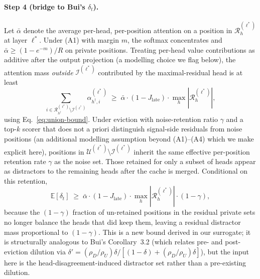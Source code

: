 \documentclass{article} %
\begin{document}
\paragraph{Step 4 (bridge to Bui's $\delta_t$).}
Let $\bar\alpha$ denote the average per-head, per-position attention on a
position in $\mathcal{R}^{(\ell^*)}_h$ at layer $\ell^*$. Under (A1)
with margin $m$, the softmax concentrates and $\bar\alpha \geq
(1 - e^{-m})/R$ on private positions. Treating per-head value
contributions as additive after the output projection (a modelling
choice we flag below), the attention mass \emph{outside}
$\mathcal{I}^{(\ell^*)}$ contributed by the maximal-residual head is at
least
\begin{equation}
\sum_{i \in \mathcal{R}^{(\ell^*)}_{h^\dagger} \setminus
\mathcal{I}^{(\ell^*)}} \alpha^{(\ell^*)}_{h^\dagger, i}
\;\geq\;
\bar\alpha \cdot (1 - J_{\text{late}}) \cdot \max_h
|\mathcal{R}^{(\ell^*)}_h|,
\end{equation}
using Eq.~\eqref{eq:union-bound}. Under eviction with noise-retention
ratio $\gamma$ and a top-$k$ scorer that does not a priori distinguish
signal-side residuals from noise positions (an additional modelling
assumption beyond (A1)--(A4) which we make explicit here), positions in
$\mathcal{U}^{(\ell^*)} \setminus \mathcal{I}^{(\ell^*)}$ inherit the
same effective per-position retention rate $\gamma$ as the noise set.
Those retained for only a subset of heads appear as distractors to the
remaining heads after the cache is merged. Conditional on this
retention,
\begin{equation}
\label{eq:Edelta-lb}
\mathbb{E}[\delta_t]
\;\geq\;
\bar\alpha \cdot (1 - J_{\text{late}}) \cdot
\max_h |\mathcal{R}^{(\ell^*)}_h|
\cdot (1 - \gamma),
\end{equation}
because the $(1 - \gamma)$ fraction of un-retained positions in the
residual private sets no longer balance the heads that did keep them,
leaving a residual distractor mass proportional to $(1 - \gamma)$. This
is a new bound derived in our surrogate; it is structurally analogous
to Bui's Corollary~3.2 (which relates pre- and post-eviction dilution
via $\delta' = (\rho_D/\rho_U)\delta / [(1 - \delta) +
(\rho_D/\rho_U)\delta]$), but the input here is the
head-disagreement-induced distractor set rather than a pre-existing
dilution.
\end{document}
